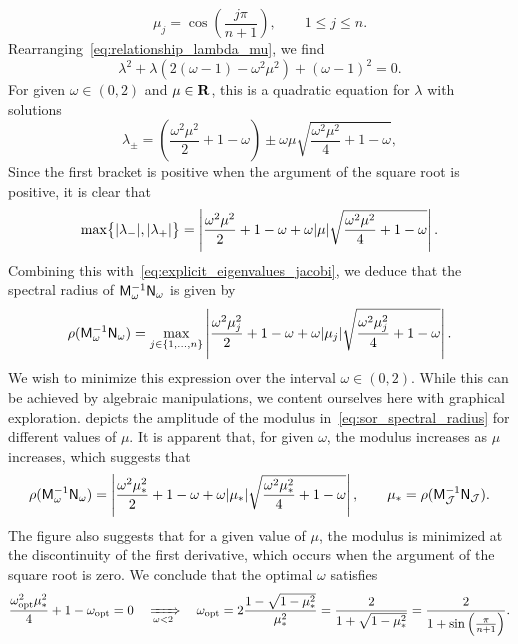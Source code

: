 \begin{solution}
\begin{equation}
        \mu_j = \cos \left( \frac{j \pi}{n+1} \right),
        \qquad 1 \leq j \leq n.
    \end{equation}
    Rearranging~\eqref{eq:relationship_lambda_mu},
    we find
    \[
        \lambda^2 + \lambda \left(2(\omega -1) - \omega^2 \mu^2\right) + (\omega - 1)^2  = 0.
    \]
    For given $\omega \in (0, 2)$ and $\mu \in \mathbf R$,
    this is a quadratic equation for $\lambda$ with solutions
    \[
        \lambda_{\pm} = \left( \frac{\omega^2 \mu^2}{2} + 1 - \omega \right) \pm \omega \mu \sqrt{\frac{\omega^2 \mu^2}{4} + 1 - \omega},
    \]
    Since the first bracket is positive when the argument of the square root is positive,
    it is clear that
    \[
        \max \bigl\{ \lvert\lambda_{-}\rvert, \lvert\lambda_{+}\rvert \bigr\}
        = \left| \frac{\omega^2 \mu^2}{2} + 1 - \omega + \omega \lvert\mu\rvert \sqrt{\frac{\omega^2 \mu^2}{4} + 1 - \omega} \right|.
    \]
    Combining this with~\eqref{eq:explicit_eigenvalues_jacobi},
    we deduce that the spectral radius of $\mathsf M_{\omega}^{-1} \mathsf N_{\omega}$ is given by
    \begin{equation}
        \label{eq:sor_spectral_radius}
        \rho(\mathsf M_{\omega}^{-1} \mathsf N_{\omega}) =
        \max_{j \in \{1, \dotsc, n\}} \left| \frac{\omega^2 \mu_j^2}{2} + 1 - \omega + \omega \lvert\mu_j\rvert \sqrt{\frac{\omega^2 \mu_j^2}{4} + 1 - \omega} \right|.
    \end{equation}
    We wish to minimize this expression over the interval $\omega \in (0, 2)$.
    While this can be achieved by algebraic manipulations,
    we content ourselves here with graphical exploration.
     depicts the amplitude of the modulus in~\eqref{eq:sor_spectral_radius}
    for different values of $\mu$.
    It is apparent that, for given $\omega$,
    the modulus increases as $\mu$ increases,
    which suggests that
    \begin{equation}
        \rho(\mathsf M_{\omega}^{-1} \mathsf N_{\omega}) =
        \left| \frac{\omega^2 \mu_*^2}{2} + 1 - \omega + \omega \lvert\mu_*\rvert \sqrt{\frac{\omega^2 \mu_*^2}{4} + 1 - \omega} \right|,
        \qquad \mu_* = \rho(\mathsf M_{\mathcal J}^{-1} \mathsf N_{\mathcal J}).
    \end{equation}
    The figure also suggests that for a given value of $\mu$,
    the modulus is minimized at the discontinuity of the first derivative,
    which occurs when the argument of the square root is zero.
    We conclude that the optimal $\omega$ satisfies
    \[
        \frac{\omega_{\rm opt}^2 \mu_*^2}{4} + 1 - \omega_{\rm opt} = 0
        \quad \xRightarrow[\omega < 2]{}  \quad
        \omega_{\rm opt} = 2\frac{1 - \sqrt{1 - \mu_*^2}}{\mu_*^2}
        = \frac{2}{1 + \sqrt{1 - \mu_*^2}}
        = \frac{2}{1 + \sin\left(\frac{\pi}{n+1}\right)}.
    \]
\end{solution}
